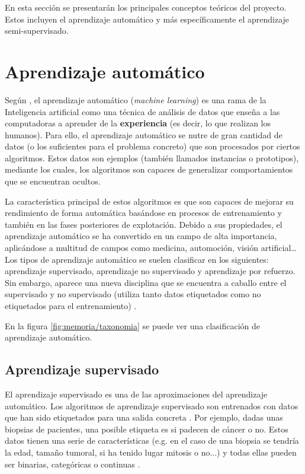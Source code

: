 
En esta sección se presentarán los principales conceptos teóricos del proyecto.
Estos incluyen el aprendizaje automático y más específicamente el aprendizaje
semi-supervisado.

\section{Aprendizaje automático}

Según \cite{intelligent:ml}, el aprendizaje automático (\textit{machine
learning}) es una rama de la Inteligencia artificial como una técnica de
análisis de datos que enseña a las computadoras a aprender de la
\textbf{experiencia} (es decir, lo que realizan los humanos). Para ello, el
aprendizaje automático se nutre de gran cantidad de datos (o los suficientes
para el problema concreto) que son procesados por ciertos algoritmos. Estos
datos son ejemplos (también llamados instancias o prototipos), \cite{pascual:ml}
mediante los cuales, los algoritmos son capaces de generalizar comportamientos
que se encuentran ocultos. 

La característica principal de estos algoritmos es que son capaces de mejorar su
rendimiento de forma automática basándose en procesos de entrenamiento y también
en las fases posteriores de explotación. Debido a sus propiedades, el
aprendizaje automático se ha convertido en un campo de alta importancia,
aplicándose a multitud de campos como medicina, automoción, visión
artificial\ldots Los tipos de aprendizaje automático se suelen clasificar en los
siguientes: aprendizaje supervisado, aprendizaje no supervisado y aprendizaje
por refuerzo. Sin embargo, aparece una nueva disciplina que se encuentra a
caballo entre el supervisado y no supervisado (utiliza tanto datos etiquetados
como no etiquetados para el entrenamiento) \cite{vanEngelen2020}.

En la figura \ref{fig:memoria/taxonomia} se puede ver una
clasificación de aprendizaje automático.



\subsection{Aprendizaje supervisado}

El aprendizaje supervisado es una de las aproximaciones del aprendizaje
automático. Los algoritmos de aprendizaje supervisado son entrenados con datos
que han sido etiquetados para una salida concreta \cite{david:sl}. Por ejemplo,
dadas unas biopsias de pacientes, una posible etiqueta es si padecen de cáncer o
no. Estos datos tienen una serie de características (e.g. en el caso de una
biopsia se tendría la edad, tamaño tumoral, si ha tenido lugar mitosis o no...)
y todas ellas pueden ser binarias, categóricas o continuas \cite{salim:sl}.


